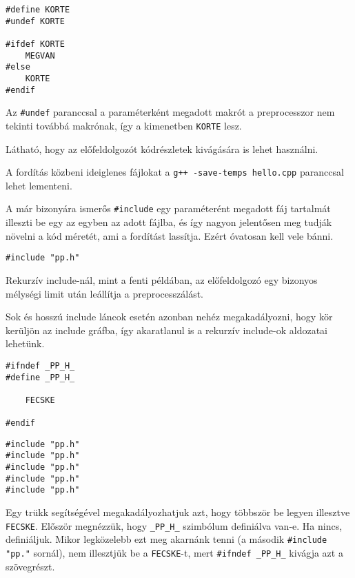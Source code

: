 \documentclass[a4paper,11.5pt]{article}
\begin{document}
	\begin{lstlisting}
#define KORTE
#undef KORTE

#ifdef KORTE
	MEGVAN
#else
	KORTE
#endif
	\end{lstlisting}
	Az \texttt{\#undef} paranccsal a paraméterként megadott makrót a preprocesszor nem tekinti továbbá makrónak, így a kimenetben \texttt{KORTE} lesz.
	
	Látható, hogy az előfeldolgozót kódrészletek kivágására is lehet használni. 
	\begin{note}
		 A fordítás közbeni ideiglenes fájlokat a \texttt{g++ -save-temps hello.cpp} paranccsal lehet lementeni.
	\end{note}
	A már bizonyára ismerős \texttt{\#include} egy paraméterént megadott fáj tartalmát illeszti be egy az egyben az adott fájlba, és így nagyon jelentősen meg tudják növelni a kód méretét, ami a fordítást lassítja. Ezért óvatosan kell vele bánni.
	\bigskip
	
	\begin{lstlisting}
#include "pp.h"
	\end{lstlisting}
		
	Rekurzív include-nál, mint a fenti példában, az előfeldolgozó egy bizonyos mélységi limit után leállítja a preprocesszálást.
	
	Sok és hosszú include láncok esetén azonban nehéz megakadályozni, hogy kör kerüljön az include gráfba, így akaratlanul is a rekurzív include-ok aldozatai lehetünk.
	\bigskip
	
	\begin{lstlisting}
#ifndef _PP_H_
#define _PP_H_

	FECSKE

#endif
	\end{lstlisting}
	
	\begin{lstlisting}
#include "pp.h"
#include "pp.h"
#include "pp.h"
#include "pp.h"
#include "pp.h"
	\end{lstlisting}
	
	Egy trükk segítségével megakadályozhatjuk azt, hogy többször be legyen illesztve \texttt{FECSKE}. Először megnézzük, hogy \texttt{\_PP\_H\_} szimbólum definiálva van-e. Ha nincs, definiáljuk. Mikor legközelebb ezt meg akarnánk tenni (a második \texttt{\#include "pp."} sornál), nem illesztjük be a \texttt{FECSKE}-t, mert \texttt{\#ifndef \_PP\_H\_} kivágja azt a szövegrészt.
	
\end{document}

